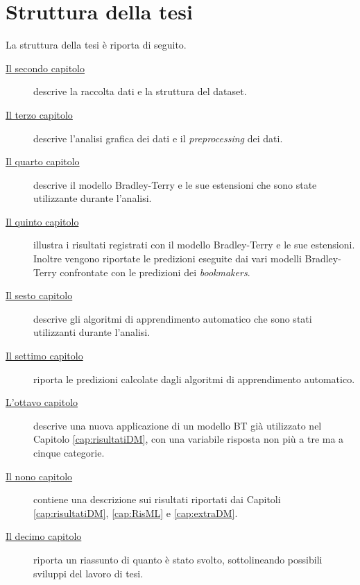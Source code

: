 \section{Struttura della tesi}
La struttura della tesi è riporta di seguito.
\begin{description}

\item[{\hyperref[cap:dataset]{Il secondo capitolo}}] descrive la raccolta dati e la struttura del dataset. 
\item[{\hyperref[cap:Analisi]{Il terzo capitolo}}] descrive l'analisi grafica dei dati e il \emph{preprocessing} dei dati. 
\item[{\hyperref[cap:BT]{Il quarto capitolo}}] descrive il modello Bradley-Terry e le sue estensioni che sono state utilizzante durante l'analisi.
\item[{\hyperref[cap:risultatiDM]{Il quinto capitolo}}] illustra i risultati registrati con il modello Bradley-Terry e le sue estensioni. Inoltre vengono riportate le predizioni eseguite dai vari modelli Bradley-Terry confrontate con le predizioni dei \emph{bookmakers}.
\item[{\hyperref[cap:ML]{Il sesto capitolo}}] descrive gli algoritmi di apprendimento automatico che sono stati utilizzanti durante l'analisi.
\item[{\hyperref[cap:RisML]{Il settimo capitolo}}] riporta le predizioni calcolate dagli algoritmi di apprendimento automatico.
\item[{\hyperref[cap:extraDM]{L'ottavo capitolo}}] descrive una nuova applicazione di un modello BT già utilizzato nel Capitolo \ref{cap:risultatiDM}, con una variabile risposta non più a tre ma a cinque categorie.
\item[{\hyperref[cap:precls]{Il nono capitolo}}] contiene una descrizione sui risultati riportati dai Capitoli \ref{cap:risultatiDM}, \ref{cap:RisML} e \ref{cap:extraDM}. 
\item[{\hyperref[cap:conclusioni]{Il decimo capitolo}}] riporta un riassunto di quanto è stato svolto, sottolineando possibili sviluppi del lavoro di tesi.
\end{description}





\begin{comment}
\begin{figure}[h]
	\begin{center}
		\texttt{[image: Logo\_azzurrodigite.png]}
		\caption{Logo di AzzurroDigitale}
	\end{center}
\end{figure}	contenuto...
\end{comment}


